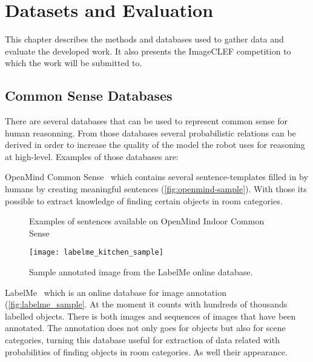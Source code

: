 \chapter{Datasets and Evaluation}
\label{chap:testing}
This chapter describes the methods and databases used to gather data and evaluate the developed work. It also presents the \gls{ImageCLEF} competition to which the work will be submitted to.

\section{Common Sense Databases}
There are several databases that can be used to represent common sense for human reasonning.
From those databases several probabilistic relations can be derived in order to increase the quality of the model the robot uses for reasoning at high-level.
Examples of those databases are:

{OpenMind Common Sense}~\citep{singh2010open} which contains several sentence-templates filled in by humans by creating meaningful sentences (\autoref{fig:openmind-sample}). With those its possible to extract knowledge of finding certain objects in room categories.

\begin{figure}[!h]
\centering
{}
\caption{Examples of sentences available on OpenMind Indoor Common Sense}
\label{fig:openmind-sample}
\end{figure}


\begin{figure}[!h]
\begin{center}
\texttt{[image: labelme\_kitchen\_sample]}
\end{center}
\caption{Sample annotated image from the LabelMe online database.}
\label{fig:labelme_sample}
\end{figure}

LabelMe~\citep{russell2008labelme} which is an online database for image annotation (\autoref{fig:labelme_sample}.
At the moment it counts with hundreds of thousands labelled objects.
There is both images and sequences of images that have been annotated.
The annotation does not only goes for objects but also for scene categories,
turning this database useful for extraction of data related with probabilities of finding objects in room categories. As well their appearance.

